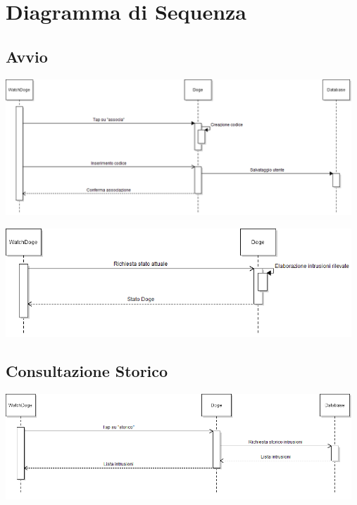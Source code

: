 \documentclass{article}
\begin{document}
\section{Diagramma di Sequenza}

\subsection{Avvio}
\begin{center}
\includegraphics[width=13cm]{1_Avvio.png}
\end{center}

\begin{center}
\includegraphics[width=13cm]{2_avvio.png}
\end{center}

\subsection{Consultazione Storico}
\begin{center}
\includegraphics[width=13cm]{Consultazione_storico.png}
\end{center}
\end{document}
